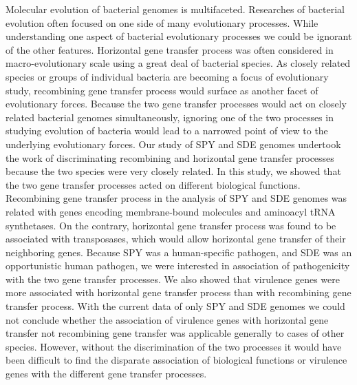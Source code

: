 \documentclass[10pt]{article}
\begin{document}
Molecular evolution of bacterial genomes is multifaceted. Researches of
bacterial evolution often focused on one side of many evolutionary processes.
While understanding one aspect of bacterial evolutionary processes we could be
ignorant of the other features.  Horizontal gene transfer process was often
considered in macro-evolutionary scale using a great deal of bacterial species.
As closely related species or groups of individual bacteria are becoming a focus
of evolutionary study, recombining gene transfer process would surface as
another facet of evolutionary forces.  Because the two gene transfer processes
would act on closely related bacterial genomes simultaneously, ignoring one of
the two processes in studying evolution of bacteria would lead to a narrowed
point of view to the underlying evolutionary forces. Our study of SPY and SDE
genomes undertook the work of discriminating recombining and horizontal gene
transfer processes because the two species were very closely related.  In this
study, we showed that the two gene transfer processes acted on different
biological functions.  Recombining gene transfer process in the analysis of SPY
and SDE genomes was related with genes encoding membrane-bound molecules and
aminoacyl tRNA synthetases. On the contrary, horizontal gene transfer process
was found to be associated with transposases, which would allow horizontal gene
transfer of their neighboring genes.  Because SPY was a human-specific pathogen,
and SDE was an opportunistic human pathogen, we were interested in association
of pathogenicity with the two gene transfer processes. We also showed that
virulence genes were more associated with horizontal gene transfer process than
with recombining gene transfer process.  With the current data of only SPY and
SDE genomes we could not conclude whether the association of virulence genes
with horizontal gene transfer not recombining gene transfer was applicable
generally to cases of other species.  However, without the discrimination of the
two processes it would have been difficult to find the disparate association of
biological functions or virulence genes with the different gene transfer
processes. 
\end{document}
